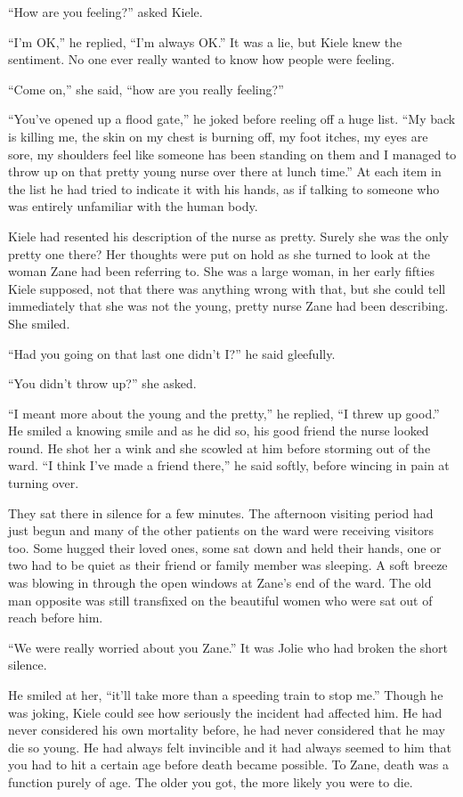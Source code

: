 ``How are you feeling?'' asked Kiele.

``I'm OK,'' he replied, ``I'm always OK.''  It was a lie, but Kiele knew the sentiment.  No one ever really wanted to know how people were feeling.  

``Come on,'' she said, ``how are you really feeling?''

``You've opened up a flood gate,'' he joked before reeling off a huge list.  ``My back is killing me, the skin on my chest is burning off, my foot itches, my eyes are sore, my shoulders feel like someone has been standing on them and I managed to throw up on that pretty young nurse over there at lunch time.''  At each item in the list he had tried to indicate it with his hands, as if talking to someone who was entirely unfamiliar with the human body.  

Kiele had resented his description of the nurse as pretty.  Surely she was the only pretty one there?  Her thoughts were put on hold as she turned to look at the woman Zane had been referring to.  She was a large woman, in her early fifties Kiele supposed, not that there was anything wrong with that, but she could tell immediately that she was not the young, pretty nurse Zane had been describing.  She smiled.

``Had you going on that last one didn't I?'' he said gleefully.

``You didn't throw up?'' she asked.

``I meant more about the young and the pretty,'' he replied, ``I threw up good.''  He smiled a knowing smile and as he did so, his good friend the nurse looked round.  He shot her a wink and she scowled at him before storming out of the ward.  ``I think I've made a friend there,'' he said softly, before wincing in pain at turning over.

They sat there in silence for a few minutes.  The afternoon visiting period had just begun and many of the other patients on the ward were receiving visitors too.  Some hugged their loved ones, some sat down and held their hands, one or two had to be quiet as their friend or family member was sleeping.  A soft breeze was blowing in through the open windows at Zane's end of the ward.  The old man opposite was still transfixed on the beautiful women who were sat out of reach before him.  

``We were really worried about you Zane.''  It was Jolie who had broken the short silence. 

He smiled at her, ``it'll take more than a speeding train to stop me.''  Though he was joking, Kiele could see how seriously the incident had affected him.  He had never considered his own mortality before, he had never considered that he may die so young.  He had always felt invincible and it had always seemed to him that you had to hit a certain age before death became possible.  To Zane, death was a function purely of age.  The older you got, the more likely you were to die.

